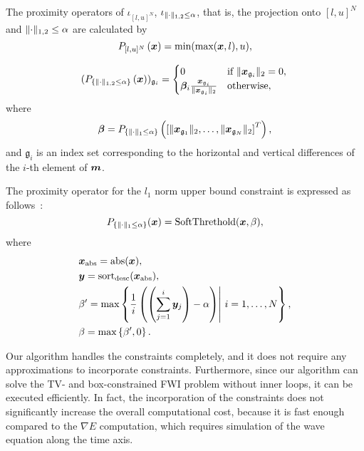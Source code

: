 The proximity operators of $\iota_{[l,u]^N}$, $\iota_{\LOneTwoNorm{\cdot} \le \alpha}$, that is, the projection onto $[l,u]^N$ and ${\LOneTwoNorm{\cdot} \le \alpha}$ are calculated by
\begin{equation} \label{eq:ProximityOperatorForBoxConstraint} \projBoxSolution, \end{equation}

\begin{equation} \label{eq:ProximityOperatorForL12Ball} \projLOneTwoBallSolution \end{equation}
where
\begin{equation} \label{eq:ProximityOperatorForL12BallWhere} \projLOneTwoBallSolutionWhere, \notag \end{equation}
and $\mathfrak{g}_i$ is an index set corresponding to the horizontal and vertical differences of the $i$-th element of $\velModel$.

The proximity operator for the $l_1$ norm upper bound constraint is expressed as follows~\cite{L1-ball-projection}:
\begin{equation} \label{eq:ProximityOperatorForL1Ball}  \projLOneBallSolution, \end{equation}
where
\begin{equation} \label{eq:ProximityOperatorForL1BallWhere} \projLOneBallSolutionWhere \notag \end{equation}

Our algorithm handles the constraints completely, and it does not require any approximations to incorporate constraints.
Furthermore, since our algorithm can solve the TV- and box-constrained FWI problem without inner loops, it can be executed efficiently.
In fact, the incorporation of the constraints does not significantly increase the overall computational cost, because it is fast enough compared to the $\nabla E$ computation, which requires simulation of the wave equation along the time axis.
